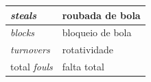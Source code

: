 \begin{table}[htbp]
\begin{longtable}{|l|l|}
		\textit{steals}                       & roubada de bola                                                                                                                             \\ \hline
		\textit{blocks}                       & bloqueio de bola                                                                                                                            \\ \hline
		\textit{turnovers}                    & rotatividade                                                                                                                                \\ \hline
		total \textit{fouls}                    & falta total                                                                                                                                 \\ \hline		
	\end{longtable}
\end{table}
\newpage
